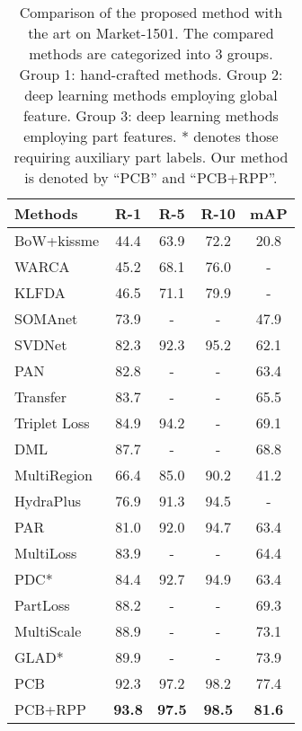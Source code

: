 \documentclass[10pt,twocolumn,letterpaper]{article}
\begin{document}
{{{\setlength{\tabcolsep}{8.3pt}
\begin{table}
\renewcommand\arraystretch{1.1}
\begin{center}
\begin{tabular}{l|cccc}
\hline
Methods &R-1&R-5&R-10&mAP \\
\hline
BoW+kissme \cite{DBLP:conf/iccv/ZhengSTWWT15}  &44.4	&63.9	&72.2  &20.8\\
WARCA\cite{Jose2016Scalable_WARCA}    &45.2	&68.1	&76.0  &-\\
KLFDA\cite{Karanam2016A_KLFDA}  &46.5	&71.1	&79.9  &-\\
\hline
SOMAnet\cite{barbosa2017looking} &73.9&-&-&47.9\\
SVDNet\cite{Sun2017SVDNet} &{82.3}&{92.3}&{95.2}&{62.1}\\
PAN\cite{Zheng2017PAN} &82.8&-&-&63.4\\
Transfer \cite{geng2016deep}  &{83.7}&-&-&{65.5}\\
Triplet Loss \cite{Hermans2017DefenseTriplet}  &84.9	&94.2  &-   &69.1\\
DML  \cite{Zhang2017DeepMutualLearning}      &87.7&-&-&68.8\\

\hline
MultiRegion \cite{Ustinova2015Multiregion}  &66.4	&85.0	&90.2   &41.2\\
HydraPlus \cite{Liu2017HydraPlus} &76.9&91.3&94.5&-\\
PAR \cite{Zhao2017Deeply}   &81.0&92.0&94.7&63.4\\
MultiLoss \cite{Li2017_multiloss} &83.9&-&-&64.4\\
PDC* \cite{Su2017Pose}    &84.4&92.7&94.9&63.4\\
PartLoss \cite{Yao2017Deep}  &88.2&-&-&69.3\\
MultiScale \cite{ChenPerson_multiscale}&88.9&-&-&73.1\\
GLAD* \cite{Wei2017GLAD}         &89.9&-&-&73.9\\

\hline
PCB  &92.3&97.2&98.2&77.4\\
PCB+RPP &\textbf{93.8}&\textbf{97.5}&\textbf{98.5}&\textbf{81.6} \\

\hline
\end{tabular}
\end{center}
\setlength{\abovecaptionskip}{0cm}
\caption{Comparison of the proposed method with the art on Market-1501. The compared methods are categorized into 3 groups. Group 1: hand-crafted methods. Group 2: deep learning methods employing global feature. Group 3: deep learning methods employing part features. * denotes those requiring auxiliary part labels. Our method is denoted by ``PCB'' and ``PCB+RPP''.}
\label{table:cmp_sota_market}
\end{table}



}}}
\end{document}
